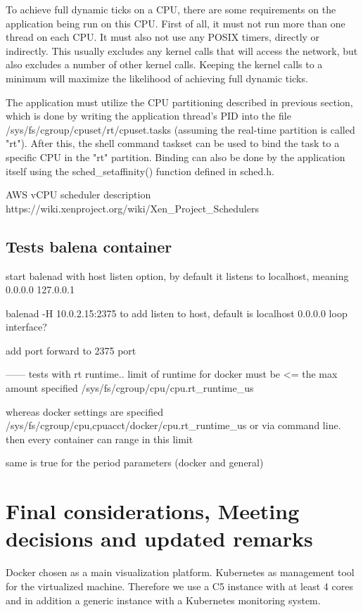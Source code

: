 \documentclass[]{scrartcl}
\begin{document}

To achieve full dynamic ticks on a CPU, there are some requirements on the application being run on this CPU. First of all, it must not run more than one thread on each CPU. It must also not use any POSIX timers, directly or indirectly. This usually excludes any kernel calls that will access the network, but also excludes a number of other kernel calls. Keeping the kernel calls to a minimum will maximize the likelihood of achieving full dynamic ticks.

The application must utilize the CPU partitioning described in previous section, which is done by writing the application thread's PID into the file /sys/fs/cgroup/cpuset/rt/cpuset.tasks (assuming the real-time partition is called "rt"). After this, the shell command taskset can be used to bind the task to a specific CPU in the "rt" partition. Binding can also be done by the application itself using the sched_setaffinity() function defined in sched.h.


AWS vCPU scheduler description
https://wiki.xenproject.org/wiki/Xen_Project_Schedulers



\subsection{Tests balena container}

start balenad with host listen option, by default it listens to localhost, meaning 0.0.0.0 127.0.0.1

balenad -H 10.0.2.15:2375 to add listen to host, default is localhost 0.0.0.0 loop interface?

add port forward to 2375 port


------
tests with rt runtime..
limit of runtime for docker must be <= the max amount specified
/sys/fs/cgroup/cpu/cpu.rt\_runtime\_us 

whereas docker settings are specified 
/sys/fs/cgroup/cpu,cpuacct/docker/cpu.rt\_runtime\_us
or via command line. then every container can range in this limit

same is true for the period parameters (docker and general)


\section{Final considerations, Meeting decisions and updated remarks}

Docker chosen as a main visualization platform. Kubernetes as management tool for the virtualized machine. Therefore we use a C5 instance with at least 4 cores and in addition a generic instance with a Kubernetes monitoring system.
\end{document}
